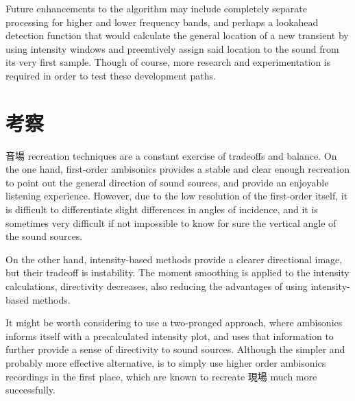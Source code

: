 \documentclass[a4paper, 12pt]{article}
\begin{document}
Future enhancements to the algorithm may include completely separate processing for higher and lower frequency bands, and perhaps a lookahead detection function that would calculate the general location of a new transient by using intensity windows and preemtively assign said location to the sound from its very first sample. Though of course, more research and experimentation is required in order to test these development paths.

\section{考察}

音場 recreation techniques are a constant exercise of tradeoffs and balance. On the one hand, first-order ambisonics provides a stable and clear enough recreation to point out the general direction of sound sources, and provide an enjoyable listening experience. However, due to the low resolution of the first-order itself, it is difficult to differentiate slight differences in angles of incidence, and it is sometimes very difficult if not impossible to know for sure the vertical angle of the sound sources.

On the other hand, intensity-based methods provide a clearer directional image, but their tradeoff is instability. The moment smoothing is applied to the intensity calculations, directivity decreases, also reducing the advantages of using intensity-based methods. 

It might be worth considering to use a two-pronged approach, where ambisonics informs itself with a precalculated intensity plot, and uses that information to further provide a sense of directivity to sound sources. Although the simpler and probably more effective alternative, is to simply use higher order ambisonics recordings in the first place, which are known to recreate 現場 much more successfully.



\end{document}

